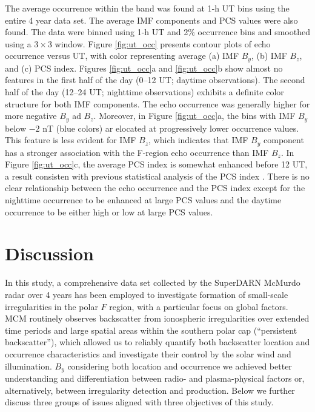 The average occurrence within the band was found at 1-h UT bins using the entire 4 year data set.  The average IMF components and PCS values were also found.  The data were binned using 1-h UT and 2\% occurrence bins and smoothed using a \(3\times3\) window.  Figure \ref{fig:ut_occ} presents contour plots of echo occurrence  versus UT, with color representing average (a) IMF \(B_y\), (b) IMF \(B_z\), and (c) PCS index.  Figures \ref{fig:ut_occ}a and \ref{fig:ut_occ}b show almost no features in the first half of the day (0--12 UT; daytime observations).  The second half of the day (12--24 UT; nighttime observations) exhibits a definite color structure for both IMF components.  The echo occurrence was generally higher for more negative \(B_y\) ad \(B_z\).  Moreover, in Figure \ref{fig:ut_occ}a, the bins with IMF \(B_y\) below \(-2\) nT (blue colors) ar elocated at progressively lower occurrence values.  This feature is less evident for IMF \(B_z\), which indicates that IMF \(B_y\) component has a stronger association with the F-region echo occurrence than IMF \(B_z\).  In Figure \ref{fig:ut_occ}c, the average PCS index is somewhat enhanced before 12 UT, a result consisten with previous statistical analysis of the PCS index \citep[e.g.][Figure 4]{Troshichev2007}.  There is no clear relationship between the echo occurrence and the PCS index except for the nighttime occurrence to be enhanced at large PCS values and the daytime occurrence to be either high or low at large PCS values.


\section{Discussion}
\label{sec:p1discussion}

In this study, a comprehensive data set collected by the SuperDARN McMurdo radar over 4 years has been employed to investigate formation of small-scale irregularities in the polar \(F\) region, with a particular focus on global factors. MCM routinely observes backscatter from ionospheric irregularities over extended time periods and large spatial areas within the southern polar cap (``persistent backscatter''), which allowed us to reliably quantify both backscatter location and occurrence characteristics and investigate their control by the solar wind and illumination. \(B_y\) considering both location and occurrence we achieved better understanding and differentiation between radio- and plasma-physical factors or, alternatively, between irregularity detection and production. Below we further discuss three groups of issues aligned with three objectives of this study.

